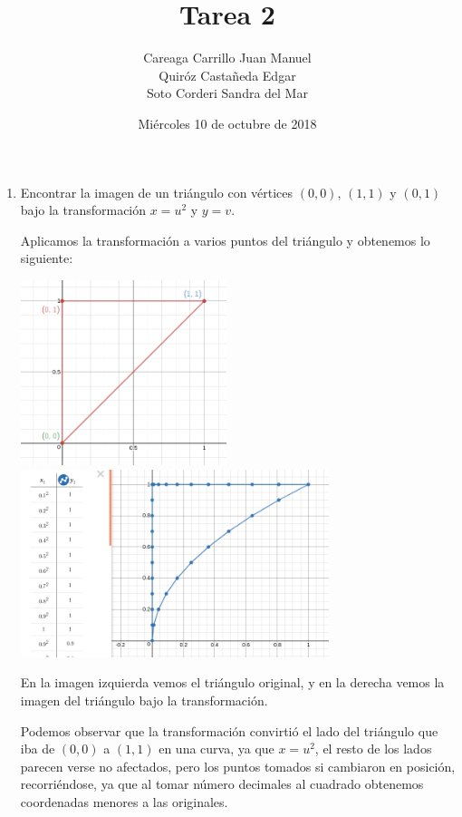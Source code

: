 \documentclass{article}
\begin{document}
    \title{Tarea 2}
    \author{Careaga Carrillo Juan Manuel\\
            Quiróz Castañeda Edgar\\
            Soto Corderi Sandra del Mar}
    \date{Miércoles 10 de octubre de 2018}
    \maketitle
    \begin{enumerate}

        \item {
            Encontrar la imagen de un triángulo con vértices $(0,0)$, $(1,1)$
            y $(0,1)$ bajo la transformación $x=u^2$ y $y=v$.

            \color{azul}
          Aplicamos la transformación a varios puntos del triángulo y obtenemos lo siguiente:
            \begin{center}
                \includegraphics[width=6cm]{img/ejercicio1-1.png}
                \hspace{.5cm}
                \includegraphics[width=9cm]{img/ejercicio1-2.png}
        	\end{center}
            En la imagen izquierda vemos el triángulo original, y en la derecha
            vemos la imagen del triángulo bajo la transformación.
            
            Podemos observar que la transformación convirtió el lado del triángulo que iba de $(0,0)$ a $(1,1)$ en una curva, ya que $x=u^2$, el resto de los lados parecen verse no afectados, pero los puntos tomados si cambiaron en posición, recorriéndose, ya que al tomar número decimales al cuadrado obtenemos coordenadas menores a las originales.
	    }


\end{enumerate}
\end{document}

